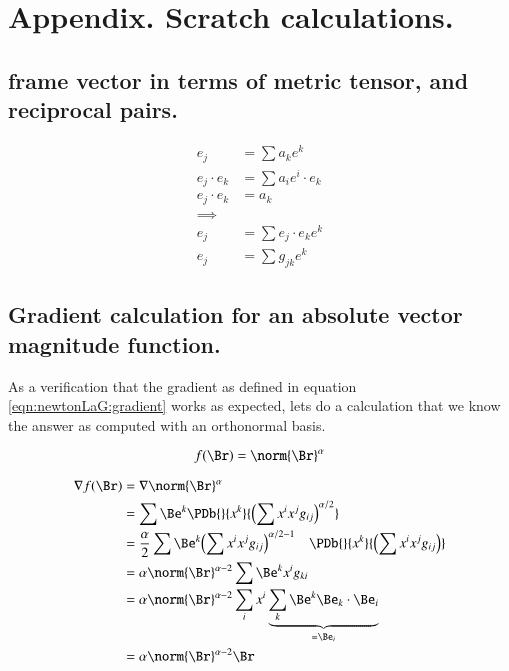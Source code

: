 \section{Appendix.  Scratch calculations. }

\subsection{frame vector in terms of metric tensor, and reciprocal pairs. }

\begin{align*}
e_j &= \sum a_k e^k \\
e_j \cdot e_k &= \sum a_i e^i \cdot e_k \\
e_j \cdot e_k &= a_k \\
\implies & \\
e_j &= \sum e_j \cdot e_k e^k \\
e_j &= \sum g_{jk} e^k
\end{align*}

\subsection{Gradient calculation for an absolute vector magnitude function. }

As a verification that the gradient as defined in equation \ref{eqn:newtonLaG:gradient} works as expected, lets do a calculation that we know the answer as computed with an
orthonormal basis.

\begin{equation*}
f(\Br) = \norm{\Br}^\alpha
\end{equation*}

\begin{align*}
\grad f(\Br) 
&= \grad \norm{\Br}^\alpha \\
&= \sum \Be^k \PDb{} {x^k} {{\left(\sum x^i x^j g_{ij}\right)}^{\alpha/2}} \\
&= \frac{\alpha}{2} \sum \Be^k {{\left(\sum x^i x^j g_{ij}\right)}^{\alpha/2 -1}} \quad \PDb{}{x^k} {\left(\sum x^i x^j g_{ij}\right)} \\
&= \alpha \norm{\Br}^{\alpha-2} \sum \Be^k x^i g_{ki} \\
&= \alpha \norm{\Br}^{\alpha-2} \sum_i x^i \underbrace{\sum_k \Be^k \Be_k \cdot \Be_i}_{=\Be_i} \\
&= \alpha \norm{\Br}^{\alpha-2} \Br
\end{align*}
